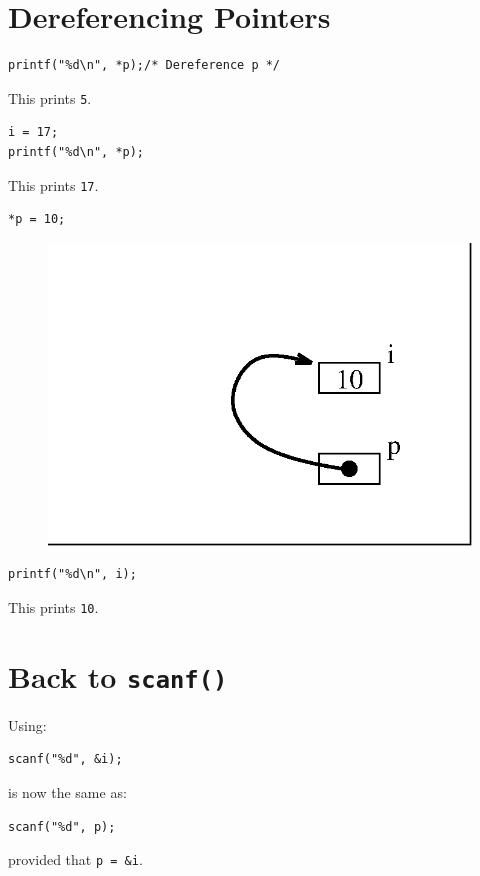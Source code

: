 \documentclass[a4,portraitt]{slides}
\begin{document}
\newpage
\section*{Dereferencing Pointers}
\begin{verbatim}
printf("%d\n", *p);/* Dereference p */
\end{verbatim}
This prints \verb^5^.
\begin{verbatim}
i = 17;
printf("%d\n", *p);
\end{verbatim}
This prints \verb^17^.

\newpage
\begin{verbatim}
*p = 10;
\end{verbatim}
\begin{center}
\begin{figure}[h]
\centerline{
\includegraphics{../Figs/point8_5.eps}
}
\end{figure}
\end{center}
\begin{verbatim}
printf("%d\n", i);
\end{verbatim}
This prints \verb^10^.

\newpage
\section*{Back to {\tt scanf()}}
Using:
\begin{verbatim}
scanf("%d", &i);
\end{verbatim}
is now the same as:
\begin{verbatim}
scanf("%d", p);
\end{verbatim}
provided that \verb^p = &i^.
\end{document}
